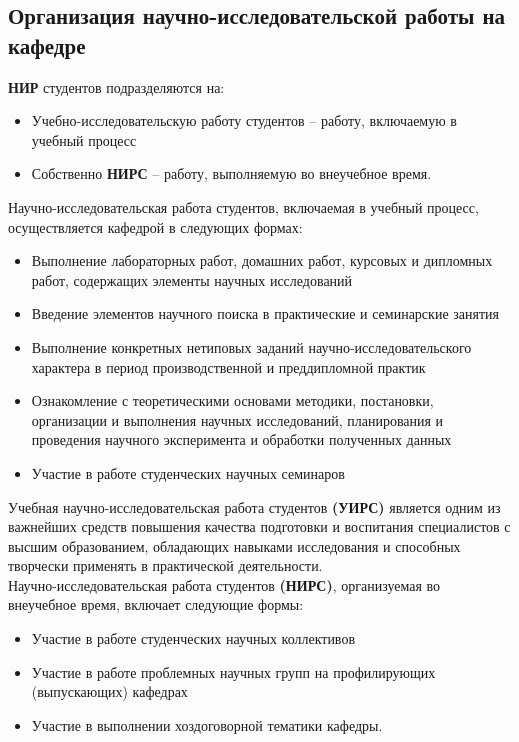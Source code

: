 \documentclass[12pt,a4paper]{article}
\begin{document}
\begin{flushleft}
\subsection{Организация научно-исследовательской работы на кафедре}
\begin{flushleft}
\large
\textbf{НИР} студентов подразделяются на:\\
\begin{itemize}
\item Учебно-исследовательскую работу студентов – работу, включаемую в учебный процесс
\item Собственно \textbf{НИРС} – работу, выполняемую во внеучебное время.
\end{itemize}
Научно-исследовательская работа студентов, включаемая в учебный процесс, осуществляется кафедрой в следующих формах:
\begin{itemize}
\item Выполнение лабораторных работ, домашних работ, курсовых и дипломных работ, содержащих элементы научных исследований
\item Введение элементов научного поиска в практические и семинарские занятия
\item Выполнение конкретных нетиповых заданий научно-исследовательского характера в период производственной и преддипломной практик
\item Ознакомление с теоретическими основами методики, постановки, организации и выполнения научных исследований, планирования и проведения научного эксперимента и обработки полученных данных
\item Участие в работе студенческих научных семинаров
\end{itemize}
Учебная научно-исследовательская работа студентов \textbf{(УИРС)} является одним из важнейших средств повышения качества подготовки и воспитания специалистов с высшим образованием, обладающих навыками исследования и способных творчески применять в практической деятельности.
\\
Научно-исследовательская работа студентов \textbf{(НИРС)}, организуемая во внеучебное время, включает следующие формы:\\
\begin{itemize}
\item Участие в работе студенческих научных коллективов
\item Участие в работе проблемных научных групп на профилирующих (выпускающих) кафедрах
\item Участие в выполнении хоздоговорной тематики кафедры.
\end{itemize}

\end{flushleft}
\end{flushleft}
\end{document}
